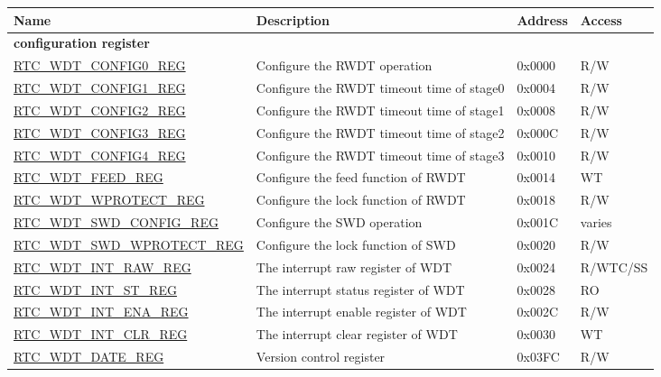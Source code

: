 \begin{longtable}{ | p{6cm} | p{7.2cm} | p{1.3cm} | p{1cm} | }
\hline\rowcolor{lightgray}
\textbf{Name} & \textbf{Description} &  \textbf{Address} & \textbf{Access} \\ \hline
\endhead
\multicolumn{4}{|l|}{\textbf{configuration register}} \\ \hline
\hyperref[regdesc:RTCWDTCONFIG0REG]{RTC\_WDT\_CONFIG0\_REG} & Configure the RWDT operation & 0x0000 & R/W \\ \hline
\hyperref[regdesc:RTCWDTCONFIG1REG]{RTC\_WDT\_CONFIG1\_REG} & Configure the RWDT timeout time of stage0 & 0x0004 & R/W \\ \hline
\hyperref[regdesc:RTCWDTCONFIG2REG]{RTC\_WDT\_CONFIG2\_REG} & Configure the RWDT timeout time of stage1 & 0x0008 & R/W \\ \hline
\hyperref[regdesc:RTCWDTCONFIG3REG]{RTC\_WDT\_CONFIG3\_REG} & Configure the RWDT timeout time of stage2 & 0x000C & R/W \\ \hline
\hyperref[regdesc:RTCWDTCONFIG4REG]{RTC\_WDT\_CONFIG4\_REG} & Configure the RWDT timeout time of stage3 & 0x0010 & R/W \\ \hline
\hyperref[regdesc:RTCWDTFEEDREG]{RTC\_WDT\_FEED\_REG} & Configure the feed function of RWDT & 0x0014 & WT \\ \hline
\hyperref[regdesc:RTCWDTWPROTECTREG]{RTC\_WDT\_WPROTECT\_REG} & Configure the lock function of RWDT & 0x0018 & R/W \\ \hline
\hyperref[regdesc:RTCWDTSWDCONFIGREG]{RTC\_WDT\_SWD\_CONFIG\_REG} & Configure the SWD operation & 0x001C & varies \\ \hline
\hyperref[regdesc:RTCWDTSWDWPROTECTREG]{RTC\_WDT\_SWD\_WPROTECT\_REG} & Configure the lock function of SWD & 0x0020 & R/W \\ \hline
\hyperref[regdesc:RTCWDTINTRAWREG]{RTC\_WDT\_INT\_RAW\_REG} & The interrupt raw register of WDT & 0x0024 & R/WTC/SS \\ \hline
\hyperref[regdesc:RTCWDTINTSTREG]{RTC\_WDT\_INT\_ST\_REG} & The interrupt status register of WDT & 0x0028 & RO \\ \hline
\hyperref[regdesc:RTCWDTINTENAREG]{RTC\_WDT\_INT\_ENA\_REG} & The interrupt enable register of WDT & 0x002C & R/W \\ \hline
\hyperref[regdesc:RTCWDTINTCLRREG]{RTC\_WDT\_INT\_CLR\_REG} & The interrupt clear register of WDT & 0x0030 & WT \\ \hline
\hyperref[regdesc:RTCWDTDATEREG]{RTC\_WDT\_DATE\_REG} & Version control register & 0x03FC & R/W \\ \hline
\end{longtable}
